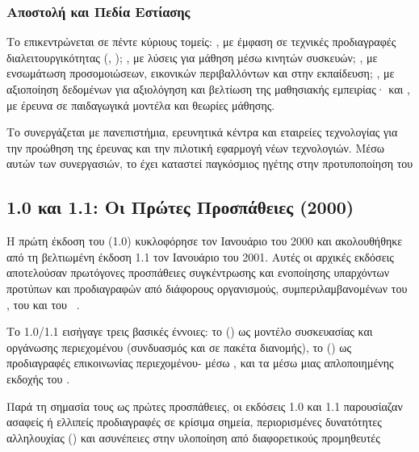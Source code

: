 \subsubsection{Αποστολή και Πεδία Εστίασης}

Το  επικεντρώνεται σε πέντε κύριους τομείς:  , με έμφαση σε τεχνικές προδιαγραφές διαλειτουργικότητας (, );  , με λύσεις για μάθηση μέσω κινητών συσκευών;    , με ενσωμάτωση προσομοιώσεων, εικονικών περιβαλλόντων και \textit{ } στην εκπαίδευση;  , με αξιοποίηση δεδομένων για αξιολόγηση και βελτίωση της μαθησιακής εμπειρίας· και     , με έρευνα σε παιδαγωγικά μοντέλα και θεωρίες μάθησης.

Το  συνεργάζεται με πανεπιστήμια, ερευνητικά κέντρα και εταιρείες τεχνολογίας για την προώθηση της έρευνας και την πιλοτική εφαρμογή νέων τεχνολογιών. Μέσω αυτών των συνεργασιών, το  έχει καταστεί παγκόσμιος ηγέτης στην προτυποποίηση του 

\subsection{ 1.0 και 1.1: Οι Πρώτες Προσπάθειες (2000)}
\label{subsec:scorm_10_11}

Η πρώτη έκδοση του  (1.0) κυκλοφόρησε τον Ιανουάριο του 2000 και ακολουθήθηκε από τη βελτιωμένη έκδοση 1.1 τον Ιανουάριο του 2001. Αυτές οι αρχικές εκδόσεις αποτελούσαν πρωτόγονες προσπάθειες συγκέντρωσης και ενοποίησης υπαρχόντων προτύπων και προδιαγραφών από διάφορους οργανισμούς, συμπεριλαμβανομένων του , του     και του ~\cite{scormcom2024versions}.

Το  1.0/1.1 εισήγαγε τρεις βασικές έννοιες: το    () ως μοντέλο συσκευασίας και οργάνωσης περιεχομένου (συνδυασμός  και  σε πακέτα διανομής), το   () ως προδιαγραφές επικοινωνίας περιεχομένου- μέσω  , και τα  μέσω μιας απλοποιημένης εκδοχής του  .

Παρά τη σημασία τους ως πρώτες προσπάθειες, οι εκδόσεις 1.0 και 1.1 παρουσίαζαν ασαφείς ή ελλιπείς προδιαγραφές σε κρίσιμα σημεία, περιορισμένες δυνατότητες αλληλουχίας (\textit{}) και ασυνέπειες στην υλοποίηση από διαφορετικούς προμηθευτές 


